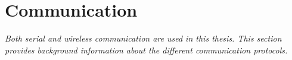 \section{Communication}
\label{sec:tCommunication}
\textit{Both serial and wireless communication are used in this thesis. This section provides background information about the different communication protocols.}


%